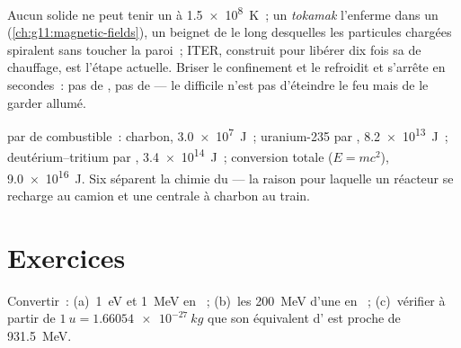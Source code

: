 \begin{remark}\label{rem:g12:nuclear-energy:iter}
Aucun solide ne peut tenir un  à
\qty{1.5e8}{K}~; un \emph{tokamak} l'enferme dans un
 (\cref{ch:g11:magnetic-fields}), un
beignet de  le long
desquelles les particules chargées spiralent sans toucher la paroi~;
ITER, construit pour libérer dix fois sa
 de chauffage, est l'étape actuelle. Briser
le confinement et le  refroidit et s'arrête en
secondes~: pas de , pas de
 --- le difficile n'est pas d'éteindre
le feu mais de le garder allumé.
\end{remark}

\begin{example}\label{ex:g12:nuclear-energy:ladder}
 par  de
combustible~: charbon, \qty{3.0e7}{J}~; uranium-235 par
, \qty{8.2e13}{J}~; deutérium--tritium par
, \qty{3.4e14}{J}~; conversion totale
($E = mc^2$), \qty{9.0e16}{J}. Six  séparent la
chimie du  --- la raison pour laquelle un
réacteur se recharge au camion et une centrale à charbon au train.
\end{example}

\section{Exercices}

\begin{exercise}[$\star$]\label{exo:g12:nuclear-energy:1}
Convertir~: (a)~\qty{1}{eV} et \qty{1}{MeV} en
~; (b)~les \qty{200}{MeV} d'une
 en ~;
(c)~vérifier à partir de $\qty{1}{u} = \qty{1.66054e-27}{kg}$ que son
équivalent d' est proche de \qty{931.5}{MeV}.
\end{exercise}

